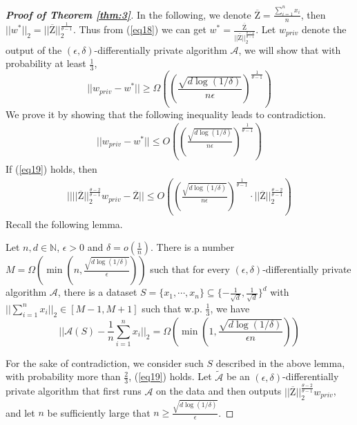 \documentclass[12pt]{alt2022} %
\renewcommand{\tilde}{\widetilde}
\begin{document}
\begin{proof}[{\bf Proof of Theorem \ref{thm:3}}]
		
		In the following, we denote $\overline{\mathrm{Z}}=\frac{\sum_{i=1}^{n}x_i}{ n}$, then $||w^{*}||_2=||\overline{\mathrm{Z}}||_2^{\frac{1}{\theta-1}}$. Thus from  (\ref{eq18}) we can get  $w^{*}=\frac{\overline{\mathrm{Z}}}{||\overline{\mathrm{Z}}||_2^{\frac{\theta-2}{\theta-1}}}$. 
		Let $w_{priv}$ denote the output of the $(\epsilon,\delta)$-differentially private algorithm $\mathcal{A}$,  we will show that with probability at least $\frac{1}{3}$, 
			\begin{equation*}
		||w_{priv}-w^*||\geq \Omega\left( \left(\frac{\sqrt{d\log(1/\delta)}}{n\epsilon}\right)^{\frac{1}{\theta-1}}\right)
		\end{equation*}
		We prove it by showing that the following inequality leads to contradiction.
			\begin{equation}\label{eq19}
		\begin{aligned}
		||w_{priv}-w^*||\leq O\left( \left(\frac{\sqrt{d\log(1/\delta)}}{n\epsilon}\right)^{\frac{1}{\theta-1}}\right)
		\end{aligned}
		\end{equation}
If (\ref{eq19}) holds, then 
	\begin{equation}\label{eq20}
\begin{aligned}
||||\overline{\mathrm{Z}}||_2^{\frac{\theta-2}{\theta-1}}w_{priv}-\overline{\mathrm{Z}}||
\leq O\left( \left(\frac{\sqrt{d\log(1/\delta)}}{n\epsilon}\right)^{\frac{1}{\theta-1}}\cdot||\overline{\mathrm{Z}}||_2^{\frac{\theta-2}{\theta-1}}\right)
\end{aligned}
\end{equation}
Recall the following lemma.
\begin{lemma}\label{le8}
Let $n,d\in \mathbb{N}$, $\epsilon>0$ and $\delta=o(\frac{1}{n})$. There is a number $M=\Omega\left(\min\left(n,\frac{\sqrt{d\log(1/\delta)}}{\epsilon}\right)\right)$ such that for every $(\epsilon, \delta)$-differentially private algorithm $\mathcal{A}$, there is a dataset $S=\{x_1,\cdots,x_n\}\subseteq \{-\frac{1}{\sqrt{d}},\frac{1}{\sqrt{d}}\}^d$ with $||\sum_{i=1}^{n}x_i||_2\in[M-1,M+1]$ such that w.p. $\frac{1}{3}$, we have 
	\begin{equation*}
||\mathcal{A}(S)-\frac{1}{n}\sum_{i=1}^nx_i||_2=\Omega\left(\min\left(1,\frac{\sqrt{d\log(1/\delta)}}{\epsilon n}\right)\right)
\end{equation*}
\end{lemma}
For the sake of contradiction, we consider such $S$ described in the above lemma, with probability more than $\frac{2}{3}$, (\ref{eq19}) holds. Let $\mathcal{\tilde{A}}$ be an $(\epsilon, \delta)$-differentially private algorithm that first runs $\mathcal{A}$ on the data and then outputs $||\overline{\mathrm{Z}}||_2^{\frac{\theta-2}{\theta-1}}w_{priv}$, and let $n$ be sufficiently large that $n\geq \frac{\sqrt{d\log(1/\delta)}}{\epsilon}$.




\end{proof}
\end{document}
